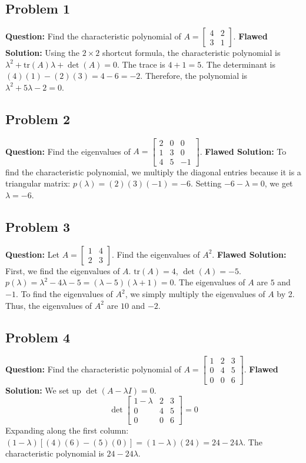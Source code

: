 \documentclass[11pt, a4paper]{article}
\theoremstyle{definition}
\theoremstyle{remark}
\begin{document}
\subsection{Problem 1}
\textbf{Question:} Find the characteristic polynomial of $A = \begin{bmatrix} 4 & 2 \\ 3 & 1 \end{bmatrix}$.
\textbf{Flawed Solution:}
Using the $2 \times 2$ shortcut formula, the characteristic polynomial is $\lambda^2 + \text{tr}(A)\lambda + \det(A) = 0$.
The trace is $4 + 1 = 5$. The determinant is $(4)(1) - (2)(3) = 4 - 6 = -2$.
Therefore, the polynomial is $\lambda^2 + 5\lambda - 2 = 0$.

\subsection{Problem 2}
\textbf{Question:} Find the eigenvalues of $A = \begin{bmatrix} 2 & 0 & 0 \\ 1 & 3 & 0 \\ 4 & 5 & -1 \end{bmatrix}$.
\textbf{Flawed Solution:}
To find the characteristic polynomial, we multiply the diagonal entries because it is a triangular matrix:
$p(\lambda) = (2)(3)(-1) = -6$.
Setting $-6 - \lambda = 0$, we get $\lambda = -6$.

\subsection{Problem 3}
\textbf{Question:} Let $A = \begin{bmatrix} 1 & 4 \\ 2 & 3 \end{bmatrix}$. Find the eigenvalues of $A^2$.
\textbf{Flawed Solution:}
First, we find the eigenvalues of $A$. $\text{tr}(A) = 4$, $\det(A) = -5$.
$p(\lambda) = \lambda^2 - 4\lambda - 5 = (\lambda - 5)(\lambda + 1) = 0$. The eigenvalues of $A$ are $5$ and $-1$.
To find the eigenvalues of $A^2$, we simply multiply the eigenvalues of $A$ by 2.
Thus, the eigenvalues of $A^2$ are $10$ and $-2$.

\subsection{Problem 4}
\textbf{Question:} Find the characteristic polynomial of $A = \begin{bmatrix} 1 & 2 & 3 \\ 0 & 4 & 5 \\ 0 & 0 & 6 \end{bmatrix}$.
\textbf{Flawed Solution:}
We set up $\det(A - \lambda I) = 0$.
\[ \det \begin{bmatrix} 1 - \lambda & 2 & 3 \\ 0 & 4 & 5 \\ 0 & 0 & 6 \end{bmatrix} = 0 \]
Expanding along the first column:
$(1 - \lambda) \left[ (4)(6) - (5)(0) \right] = (1 - \lambda)(24) = 24 - 24\lambda$.
The characteristic polynomial is $24 - 24\lambda$.
\end{document}
